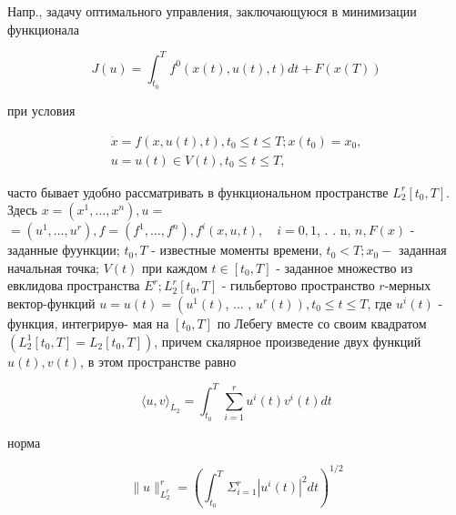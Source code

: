 \documentclass[10pt]{article}
\begin{document}
Напр., задачу оптимального управления, заключающуюся в минимизации функционала



\[

J(u)=\int_{t_{0}}^{T} f^{0}(x(t), u(t), t) d t+F(x(T))

\]



при условия



\[

\begin{gathered}

\dot{x}=f(x, u(t), t), t_{0} \leqslant t \leqslant T ; x\left(t_{0}\right)=x_{0}, \\

u=u(t) \in V(t), t_{0} \leqslant t \leqslant T,

\end{gathered}

\]



часто бывает удобно рассматривать в функциональном пространстве $L_{2}^{r}\left[t_{0}, T\right]$. Здесь $x=\left(x^{1}, \ldots, x^{n}\right), u=$ $=\left(u^{1}, \ldots, u^{r}\right), f=\left(f^{1}, \ldots, f^{n}\right), f^{i}(x, u, t), \quad i=0,1$, . . n, $n, F(x)$ - заданные фуункции; $t_{0}, T$ - известные моменты времени, $t_{0}<T ; x_{0}-$ заданная начальная точка; $V(t)$ при каждом $t \in\left[t_{0}, T\right]$ - заданное множество из евклидова пространства $E^{r} ; L_{2}^{r}\left[t_{0}, T\right]$ - гильбертово пространство $r$-мерных вектор-функций $u=u(t)=\left(u^{1}(t)\right.$, ... , $\left.u^{r}(t)\right), t_{0} \leqslant t \leqslant T$, где $u^{i}(t)$ - функция, интегрируө- мая на $\left[t_{0}, T\right]$ по Лебегу вместе со своим квадратом $\left(L_{2}^{1}\left[t_{0}, T\right]=L_{2}\left[t_{0}, T\right]\right)$, причем скалярное произведение двух функций $u(t), v(t)$, в этом пространстве равно



\[

\langle u, v\rangle_{L_{2}}=\int_{t_{0}}^{T} \sum_{i=1}^{r} u^{i}(t) v^{i}(t) d t

\]



норма



\[

\|u\|_{L_{2}^{r}}^{r}=\left(\int_{t_{0}}^{T} \Sigma_{i=1}^{r}\left|u^{i}(t)\right|^{2} d t\right)^{1 / 2}

\]
\end{document}
